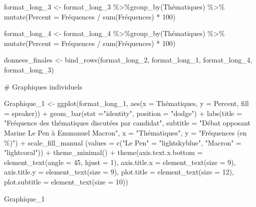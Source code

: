 \documentclass[
  letterpaper,
  DIV=11,
  numbers=noendperiod]{scrartcl}
\newenvironment{Shaded}{\begin{snugshade}}{\end{snugshade}}
\newcommand{\AttributeTok}[1]{\textcolor[rgb]{0.40,0.45,0.13}{#1}}
\newcommand{\CommentTok}[1]{\textcolor[rgb]{0.37,0.37,0.37}{#1}}
\newcommand{\DecValTok}[1]{\textcolor[rgb]{0.68,0.00,0.00}{#1}}
\newcommand{\FunctionTok}[1]{\textcolor[rgb]{0.28,0.35,0.67}{#1}}
\newcommand{\NormalTok}[1]{\textcolor[rgb]{0.00,0.23,0.31}{#1}}
\newcommand{\OtherTok}[1]{\textcolor[rgb]{0.00,0.23,0.31}{#1}}
\newcommand{\SpecialCharTok}[1]{\textcolor[rgb]{0.37,0.37,0.37}{#1}}
\newcommand{\StringTok}[1]{\textcolor[rgb]{0.13,0.47,0.30}{#1}}
\begin{document}
\begin{Shaded}
\begin{Highlighting}[]
\NormalTok{format\_long\_3 }\OtherTok{\textless{}{-}}\NormalTok{ format\_long\_3 }\SpecialCharTok{\%\textgreater{}\%}\FunctionTok{group\_by}\NormalTok{(Thématiques) }\SpecialCharTok{\%\textgreater{}\%} \FunctionTok{mutate}\NormalTok{(}\AttributeTok{Percent =}\NormalTok{ Fréquences }\SpecialCharTok{/} \FunctionTok{sum}\NormalTok{(Fréquences) }\SpecialCharTok{*} \DecValTok{100}\NormalTok{)}

\NormalTok{format\_long\_4 }\OtherTok{\textless{}{-}}\NormalTok{ format\_long\_4 }\SpecialCharTok{\%\textgreater{}\%}\FunctionTok{group\_by}\NormalTok{(Thématiques) }\SpecialCharTok{\%\textgreater{}\%} \FunctionTok{mutate}\NormalTok{(}\AttributeTok{Percent =}\NormalTok{ Fréquences }\SpecialCharTok{/} \FunctionTok{sum}\NormalTok{(Fréquences) }\SpecialCharTok{*} \DecValTok{100}\NormalTok{)}

\NormalTok{donnees\_finales }\OtherTok{\textless{}{-}} \FunctionTok{bind\_rows}\NormalTok{(format\_long\_2, format\_long\_1, format\_long\_4, format\_long\_3)}

\CommentTok{\# Graphiques individuels}

\NormalTok{Graphique\_1 }\OtherTok{\textless{}{-}} \FunctionTok{ggplot}\NormalTok{(format\_long\_1, }\FunctionTok{aes}\NormalTok{(}\AttributeTok{x =}\NormalTok{ Thématiques, }\AttributeTok{y =}\NormalTok{ Percent, }\AttributeTok{fill =}\NormalTok{ speaker)) }\SpecialCharTok{+} \FunctionTok{geom\_bar}\NormalTok{(}\AttributeTok{stat =}\StringTok{"identity"}\NormalTok{, }\AttributeTok{position =} \StringTok{"dodge"}\NormalTok{) }\SpecialCharTok{+} \FunctionTok{labs}\NormalTok{(}\AttributeTok{title =} \StringTok{"Fréquence des thématiques discutées par candidat"}\NormalTok{, }\AttributeTok{subtitle =} \StringTok{"Débat opposant Marine Le Pen à Emmanuel Macron"}\NormalTok{, }\AttributeTok{x =} \StringTok{"Thématiques"}\NormalTok{, }\AttributeTok{y =} \StringTok{"Fréquences (en \%)"}\NormalTok{) }\SpecialCharTok{+} \FunctionTok{scale\_fill\_manual}\NormalTok{ (}\AttributeTok{values =} \FunctionTok{c}\NormalTok{(}\StringTok{"Le Pen"} \OtherTok{=} \StringTok{"lightskyblue"}\NormalTok{, }\StringTok{"Macron"} \OtherTok{=} \StringTok{"lightcoral"}\NormalTok{)) }\SpecialCharTok{+} \FunctionTok{theme\_minimal}\NormalTok{() }\SpecialCharTok{+} \FunctionTok{theme}\NormalTok{(}\AttributeTok{axis.text.x.bottom =} \FunctionTok{element\_text}\NormalTok{(}\AttributeTok{angle =} \DecValTok{45}\NormalTok{, }\AttributeTok{hjust =} \DecValTok{1}\NormalTok{), }\AttributeTok{axis.title.x =} \FunctionTok{element\_text}\NormalTok{(}\AttributeTok{size =} \DecValTok{9}\NormalTok{), }\AttributeTok{axis.title.y =} \FunctionTok{element\_text}\NormalTok{(}\AttributeTok{size =} \DecValTok{9}\NormalTok{), }\AttributeTok{plot.title =} \FunctionTok{element\_text}\NormalTok{(}\AttributeTok{size =} \DecValTok{12}\NormalTok{), }\AttributeTok{plot.subtitle =} \FunctionTok{element\_text}\NormalTok{(}\AttributeTok{size =} \DecValTok{10}\NormalTok{))}

\NormalTok{Graphique\_1}
\end{Highlighting}
\end{Shaded}
\end{document}
